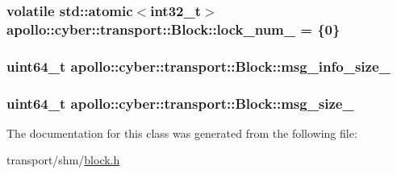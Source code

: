 \hypertarget{classapollo_1_1cyber_1_1transport_1_1Block_a8bf07ade84f828523975c578bf354021}{
\subsubsection[{lock\-\_\-num\-\_\-}]{\setlength{\rightskip}{0pt plus 5cm}volatile std\-::atomic$<$int32\-\_\-t$>$ apollo\-::cyber\-::transport\-::\-Block\-::lock\-\_\-num\-\_\- = \{0\}\hspace{0.3cm}{\ttfamily [private]}}}\label{classapollo_1_1cyber_1_1transport_1_1Block_a8bf07ade84f828523975c578bf354021}
\hypertarget{classapollo_1_1cyber_1_1transport_1_1Block_a7ee8f352a21a677cb194ca109056a762}{
\subsubsection[{msg\-\_\-info\-\_\-size\-\_\-}]{\setlength{\rightskip}{0pt plus 5cm}uint64\-\_\-t apollo\-::cyber\-::transport\-::\-Block\-::msg\-\_\-info\-\_\-size\-\_\-\hspace{0.3cm}{\ttfamily [private]}}}\label{classapollo_1_1cyber_1_1transport_1_1Block_a7ee8f352a21a677cb194ca109056a762}
\hypertarget{classapollo_1_1cyber_1_1transport_1_1Block_a2626f093e96f3b5697753e4b6f561507}{
\subsubsection[{msg\-\_\-size\-\_\-}]{\setlength{\rightskip}{0pt plus 5cm}uint64\-\_\-t apollo\-::cyber\-::transport\-::\-Block\-::msg\-\_\-size\-\_\-\hspace{0.3cm}{\ttfamily [private]}}}\label{classapollo_1_1cyber_1_1transport_1_1Block_a2626f093e96f3b5697753e4b6f561507}


The documentation for this class was generated from the following file\-:\begin{DoxyCompactItemize}
\item 
transport/shm/\hyperlink{block_8h}{block.\-h}\end{DoxyCompactItemize}
